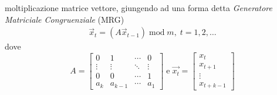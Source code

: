 moltiplicazione matrice vettore, giungendo ad una forma detta \textit{Generatore Matriciale Congruenziale} (MRG)
\begin{align}
	\vec{x}_t=(A\vec{x}_{t-1})\operatorname{mod}m,\;t=1,2,\ldots
\end{align}
dove 
\begin{equation}
	A =
	\begin{bmatrix}
		0 & 1 & \cdots & 0 \\
		\vdots & \vdots & \ddots & \vdots \\
		0 & 0 & \cdots & 1 \\
		a_k & a_{k-1} & \cdots & a_1
	\end{bmatrix}
	\;\mathrm{e}\;
	\vec{x_t} = 
	\begin{bmatrix}
		x_t \\ x_{t+1} \\ \vdots \\ x_{t+k-1}
	\end{bmatrix}
\end{equation}
